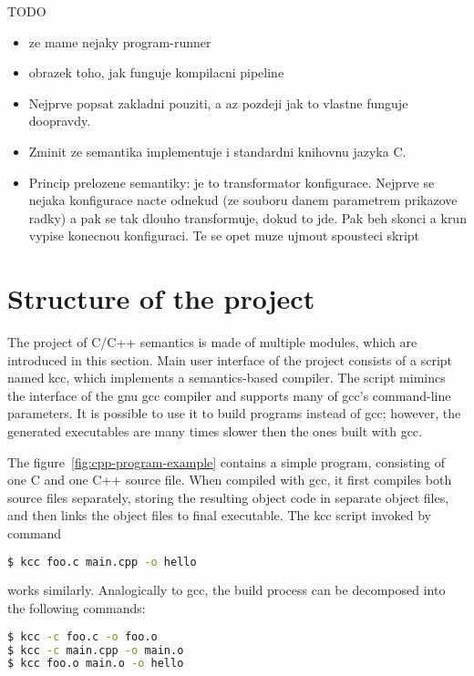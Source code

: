 \documentclass{fithesis3}
\begin{document}
TODO
\begin{itemize}
\item ze mame nejaky program-runner
\item obrazek toho, jak funguje kompilacni pipeline
\item Nejprve popsat zakladni pouziti, a az pozdeji jak to vlastne funguje doopravdy.
\item Zminit ze semantika implementuje i standardni knihovnu jazyka C.
\item Princip prelozene semantiky: je to transformator konfigurace. Nejprve se nejaka konfigurace nacte odnekud (ze souboru danem parametrem prikazove radky) a pak se tak dlouho transformuje, dokud to jde. Pak beh skonci a krun vypise konecnou konfiguraci. Te se opet muze ujmout spousteci skript 
\end{itemize}

\section{Structure of the project}



The project of C/C++ semantics is made of multiple modules, which are introduced in this section. 
Main user interface of the project consists of a script named kcc, which implements a semantics-based compiler. The script mimincs the interface of the gnu gcc compiler and supports many of gcc's command-line parameters. It is possible to use it to build programs instead of gcc; however, the generated executables are many times slower then the ones built with gcc.

The figure~\ref{fig:cpp-program-example} contains a simple program, consisting of one C and one C++ source file. When compiled with gcc, it first compiles both source files separately, storing the resulting object code in separate object files, and then links the object files to final executable. The kcc script invoked by command
\begin{lstlisting}[language=bash]
$ kcc foo.c main.cpp -o hello
\end{lstlisting}
works similarly. Analogically to gcc, the build process can be decomposed into the following commands:
\begin{lstlisting}[language=bash]
$ kcc -c foo.c -o foo.o
$ kcc -c main.cpp -o main.o
$ kcc foo.o main.o -o hello
\end{lstlisting}
\end{document}
